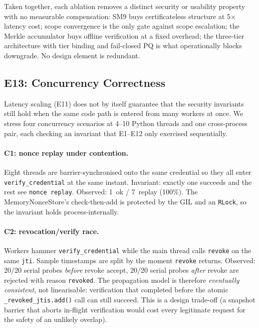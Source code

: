 \documentclass[10pt,twocolumn]{IEEEtran}
\begin{document}
Taken together, each ablation removes a distinct security or
usability property with no measurable compensation: SM9 buys
certificateless structure at 5$\times$ latency cost; scope convergence
is the only gate against scope escalation; the Merkle accumulator
buys offline verification at a fixed overhead; the three-tier
architecture with tier binding and fail-closed PQ is what
operationally blocks downgrade. No design element is redundant.

\subsection{E13: Concurrency Correctness}

Latency scaling (E11) does not by itself guarantee that the security
invariants still hold when the same code path is entered from many
workers at once. We stress four concurrency scenarios at 4--10 Python
threads and one cross-process pair, each checking an invariant that
E1--E12 only exercised sequentially.

\paragraph{C1: nonce replay under contention.} Eight threads are
barrier-synchronised onto the same credential so they all enter
\texttt{verify\_credential} at the same instant. Invariant: exactly
one succeeds and the rest see \texttt{nonce replay}. Observed:
1~ok / 7~replay (100\%). The MemoryNonceStore's check-then-add is
protected by the GIL and an \texttt{RLock}, so the invariant holds
process-internally.

\paragraph{C2: revocation/verify race.} Workers hammer
\texttt{verify\_credential} while the main thread calls
\texttt{revoke} on the same \texttt{jti}. Sample timestamps are
split by the moment \texttt{revoke} returns. Observed: 20/20 serial
probes \emph{before} revoke accept, 20/20 serial probes \emph{after}
revoke are rejected with reason \texttt{revoked}. The propagation
model is therefore \emph{eventually consistent}, not linearisable:
verification that completed before the atomic
\texttt{\_revoked\_jtis.add()} call can still succeed. This is a
design trade-off (a snapshot barrier that aborts in-flight
verification would cost every legitimate request for the safety of
an unlikely overlap).
\end{document}
